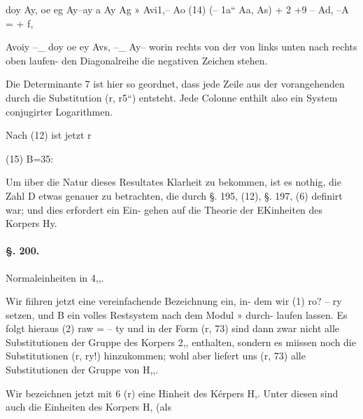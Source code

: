 \documentclass[12pt,a4paper]{article}
\theoremstyle{plain}
\theoremstyle{definition}
\begin{document}
doy Ay, oe eg Ay--ay a Ay Ag »  Avi1,-- Ao (14) (-- 1a`` Aa, As) + 2 +9 -- Ad, --A = + f,

Avoiy --\_ doy oe ey Avs, --\_ Ay-- worin rechts von der von links unten nach rechts oben laufen- den Diagonalreihe die negativen Zeichen stehen.

Die Determinante 7 ist hier so geordnet, dass jede Zeile aus der vorangehenden durch die Substitution (r, r5``) entsteht. Jede Colonne enthilt also ein System conjugirter Logarithmen.

Nach (12) ist jetzt r

(15) B=35:

Um iiber die Natur dieses Resultates Klarheit zu bekommen, ist es nothig, die Zahl D etwas genauer zu betrachten, die durch §. 195, (12), §. 197, (6) definirt war; und dies erfordert ein Ein- gehen auf die Theorie der EKinheiten des Korpers Hy.

\paragraph{§. 200.}

Normaleinheiten in 4,,.

Wir fiihren jetzt eine vereinfachende Bezeichnung ein, in- dem wir (1) ro? -- ry setzen, und B ein volles Restsystem nach dem Modul » durch- laufen lassen. Es folgt hieraus (2) raw = -- ty und in der Form (r, 73) sind dann zwar nicht alle Substitutionen der Gruppe des Korpers 2,, enthalten, sondern es miissen noch die Substitutionen (r, ry!) hinzukommen; wohl aber liefert uns (r, 73) alle Substitutionen der Gruppe von H,,.

Wir bezeichnen jetzt mit 6 (r) eine Hinheit des Kérpers H,. Unter diesen sind auch die Einheiten des Korpers H, (als
\end{document}
